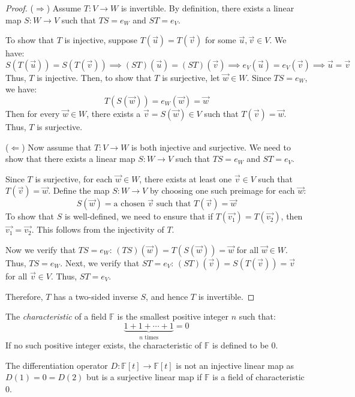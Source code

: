 \documentclass[
	11pt, %
	fleqn, %
	a4paper, %
]{LegrandOrangeBook}
\newcommand{\F}{\mathbb{F}} %
\begin{document}
\begin{proof}
    ($\Rightarrow$) Assume $T: V \to W$ is invertible. By definition, there exists a linear map $S: W \to V$ such that $TS = e_W$ and $ST = e_V$.

    To show that $T$ is injective, suppose $T(\vec{u}) = T(\vec{v})$ for some $\vec{u}, \vec{v} \in V$. We have:
    \[
        S(T(\vec{u})) = S(T(\vec{v})) \implies (ST)(\vec{u}) = (ST)(\vec{v}) \implies e_V(\vec{u}) = e_V(\vec{v}) \implies \vec{u} = \vec{v}
    \]
    Thus, $T$ is injective. Then, to show that $T$ is surjective, let $\vec{w} \in W$. Since $TS = e_W$, we have:
    \[
        T(S(\vec{w})) = e_W(\vec{w}) = \vec{w}
    \]
    Then for every $\vec{w} \in W$, there exists a $\vec{v} = S(\vec{w}) \in V$ such that $T(\vec{v}) = \vec{w}$. Thus, $T$ is surjective.

    ($\Leftarrow$) Now assume that $T: V \to W$ is both injective and surjective. We need to show that there exists a linear map $S: W \to V$ such that $TS = e_W$ and $ST = e_V$.

    Since $T$ is surjective, for each $\vec{w} \in W$, there exists at least one $\vec{v} \in V$ such that $T(\vec{v}) = \vec{w}$. Define the map $S: W \to V$ by choosing one such preimage for each $\vec{w}$:
    \[
        S(\vec{w}) = \text{a chosen } \vec{v} \text{ such that } T(\vec{v}) = \vec{w}
    \]
    To show that $S$ is well-defined, we need to ensure that if $T(\vec{v_1}) = T(\vec{v_2})$, then $\vec{v_1} = \vec{v_2}$. This follows from the injectivity of $T$.

    Now we verify that $TS = e_W$: $(TS)(\vec{w}) = T(S(\vec{w})) = \vec{w}$ for all $\vec{w} \in W$. Thus, $TS = e_W$. Next, we verify that $ST = e_V$: $(ST)(\vec{v}) = S(T(\vec{v})) = \vec{v}$ for all $\vec{v} \in V$. Thus, $ST = e_V$.

    Therefore, $T$ has a two-sided inverse $S$, and hence $T$ is invertible.
\end{proof}

\begin{definition}
    The \emph{characteristic} of a field $\F$ is the smallest positive integer $n$ such that:
    \[
        \underbrace{1 + 1 + \cdots + 1}_{n \text{ times}} = 0
    \]
    If no such positive integer exists, the characteristic of $\F$ is defined to be $0$.    
\end{definition}

\begin{example}
    The differentiation operator $D: \F[t] \to \F[t]$ is not an injective linear map as $D(1) = 0 = D(2)$ but is a surjective linear map if $\F$ is a field of characteristic $0$.
\end{example}
\end{document}
